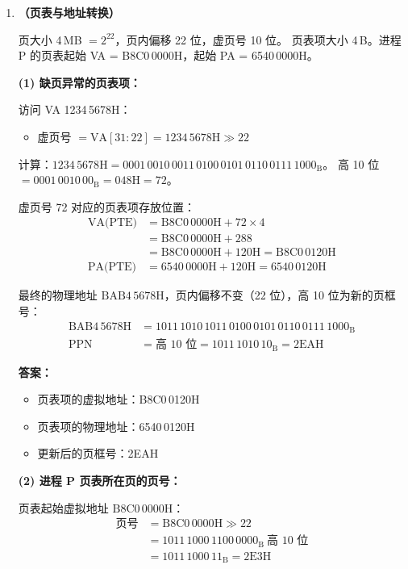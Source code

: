 \documentclass[12pt,a4paper]{ctexart}
\begin{document}
\begin{enumerate}[leftmargin=*,resume]
\item \textbf{（页表与地址转换）}

页大小 4\,MB $= 2^{22}$，页内偏移 22 位，虚页号 10 位。
页表项大小 4\,B。进程 P 的页表起始 VA = B8C0\,0000H，起始 PA = 6540\,0000H。

\textbf{(1) 缺页异常的页表项：}

访问 VA 1234\,5678H：
\begin{itemize}
\item 虚页号 $= \mathrm{VA}[31:22] = 1234\,5678\mathrm{H} \gg 22$
\end{itemize}

计算：$\mathrm{1234\,5678H} = 0001\,0010\,0011\,0100\,0101\,0110\,0111\,1000_{\mathrm{B}}$。
高 10 位 $= 0001\,0010\,00_{\mathrm{B}} = \mathrm{048H} = 72$。

虚页号 72 对应的页表项存放位置：
\begin{align*}
\text{VA(PTE)} &= \mathrm{B8C0\,0000H} + 72 \times 4 \\
&= \mathrm{B8C0\,0000H} + 288 \\
&= \mathrm{B8C0\,0000H} + \mathrm{120H} = \mathrm{B8C0\,0120H} \\[4pt]
\text{PA(PTE)} &= \mathrm{6540\,0000H} + \mathrm{120H} = \mathrm{6540\,0120H}
\end{align*}

最终的物理地址 $\mathrm{BAB4\,5678H}$，页内偏移不变（22 位），高 10 位为新的页框号：
\begin{align*}
\mathrm{BAB4\,5678H} &= 1011\,1010\,1011\,0100\,0101\,0110\,0111\,1000_{\mathrm{B}} \\
\text{PPN} &= \text{高 10 位} = 1011\,1010\,10_{\mathrm{B}} = \mathrm{2EAH}
\end{align*}

\textbf{答案：}
\begin{itemize}
\item 页表项的虚拟地址：B8C0\,0120H
\item 页表项的物理地址：6540\,0120H
\item 更新后的页框号：2EAH
\end{itemize}

\textbf{(2) 进程 P 页表所在页的页号：}

页表起始虚拟地址 $\mathrm{B8C0\,0000H}$：
\begin{align*}
\text{页号} &= \mathrm{B8C0\,0000H} \gg 22 \\
&= 1011\,1000\,1100\,0000_{\mathrm{B}}\ \text{高 10 位} \\
&= 1011\,1000\,11_{\mathrm{B}} = \mathrm{2E3H}
\end{align*}


\end{enumerate}
\end{document}
